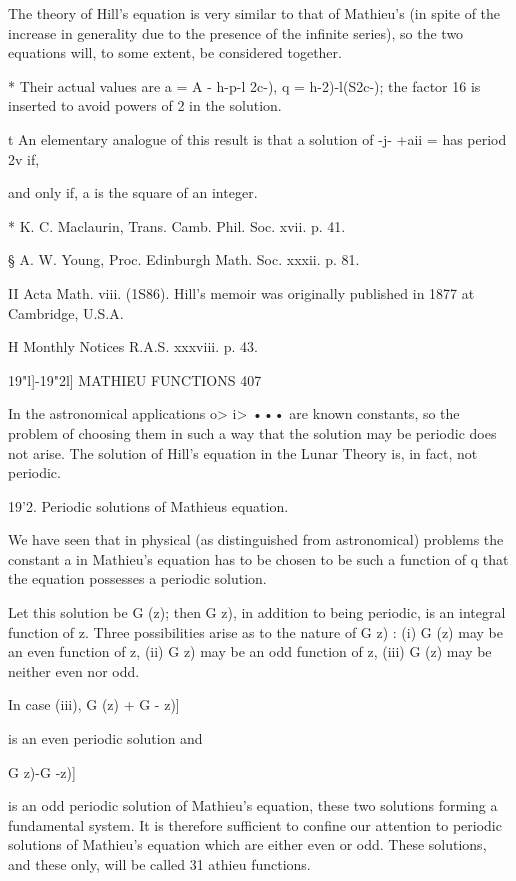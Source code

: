 The theory of Hill's equation is very similar to that of Mathieu's (in
spite of the increase in generality due to the presence of the
infinite series), so the two equations will, to some extent, be
considered together.

* Their actual values are a = A - h-p-l 2c-), q = h-2)-l(S2c-); the
factor 16 is inserted to avoid powers of 2 in the solution.

t An elementary analogue of this result is that a solution of -j- +aii
= has period 2v if,

and only if, a is the square of an integer.

* K. C. Maclaurin, Trans. Camb. Phil. Soc. xvii. p. 41.

§ A. W. Young, Proc. Edinburgh Math. Soc. xxxii. p. 81.

II Acta Math. viii. (1S86). Hill's memoir was originally published in
1877 at Cambridge, U.S.A.

H Monthly Notices R.A.S. xxxviii. p. 43.

19"l]-19"2l] MATHIEU FUNCTIONS 407

In the astronomical applications o> i> ••• are known constants, so the
problem of choosing them in such a way that the solution may be
periodic does not arise. The solution of Hill's equation in the Lunar
Theory is, in fact, not periodic.

19'2. Periodic solutions of Mathieus equation.

We have seen that in physical (as distinguished from astronomical)
problems the constant a in Mathieu's equation has to be chosen to be
such a function of q that the equation possesses a periodic solution.

Let this solution be G (z); then G z), in addition to being periodic,
is an integral function of z. Three possibilities arise as to the
nature of G z) : (i) G (z) may be an even function of z, (ii) G z) may
be an odd function of z, (iii) G (z) may be neither even nor odd.

In case (iii), G (z) + G - z)]

is an even periodic solution and

  G z)-G -z)]

is an odd periodic solution of Mathieu's equation, these two solutions
forming a fundamental system. It is therefore sufficient to confine
our attention to periodic solutions of Mathieu's equation which are
either even or odd. These solutions, and these only, will be called 31
athieu functions.

